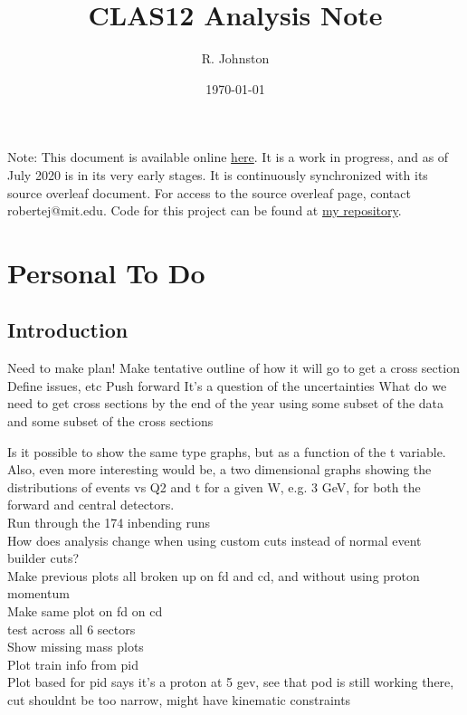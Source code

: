 \documentclass[oneside]{book}
\title{CLAS12 \DVEP Analysis Note}
\author{R. Johnston}
\date{\today}
\begin{document}
\maketitle
Note: This document is available online \href{https://latexonline.cc/compile?git=https\%3A\%2F\%2Fgithub.com\%2Frobertej19\%2FClas12AnaNote&target=main.tex&command=pdflatex\&trackId=1593973491329}{here}. It is a work in progress, and as of July 2020 is in its very early stages. It is continuously synchronized with its source overleaf document. For access to the source overleaf page, contact robertej@mit.edu. Code for this project can be found at \href{https://github.com/robertej19/analysis_code/projects/1
}{my repository}.


\iffalse
\chapter{Personal To Do}


\section{Introduction}
Need to make plan!
Make tentative outline of how it will go to get a cross section
Define issues, etc
Push forward
It’s a question of the uncertainties 
What do we need to get cross sections by the end of the year using some subset of the data and some subset of the cross sections

Is it possible to show the same type graphs, but as a function of the t variable. Also, even more interesting would be, a two dimensional graphs  showing the distributions of events vs Q2 and t  for a given W, e.g. 3 GeV, for both the forward and central detectors.\\

Run through the 174 inbending runs\\

How does analysis change when using custom cuts instead of normal event builder cuts?\\


Make previous plots all broken up on fd and cd, and without using proton momentum\\

Make same plot on fd on cd \\
test across all 6 sectors\\
Show missing mass plots\\
Plot train info from pid\\

Plot based for pid says it's a proton at 5 gev, see that pod is still working there, cut shouldnt be too narrow, might have kinematic constraints\\
\end{document}
